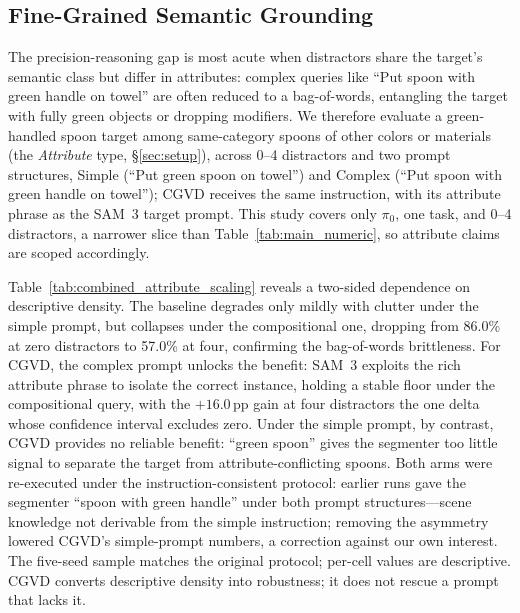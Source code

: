 \documentclass[letterpaper, 10 pt, conference]{ieeeconf}  %
\begin{document}
\subsection{Fine-Grained Semantic Grounding}
\label{sec:attribute}
The precision-reasoning gap is most acute when distractors share the target's semantic class but differ in attributes: complex queries like ``Put spoon with green handle on towel'' are often reduced to a bag-of-words, entangling the target with fully green objects or dropping modifiers. We therefore evaluate a green-handled spoon target among same-category spoons of other colors or materials (the \textit{Attribute} type, \S\ref{sec:setup}), across 0--4 distractors and two prompt structures, Simple (``Put green spoon on towel'') and Complex (``Put spoon with green handle on towel''); CGVD receives the same instruction, with its attribute phrase as the SAM~3 target prompt. This study covers only $\pi_0$, one task, and 0--4 distractors, a narrower slice than Table~\ref{tab:main_numeric}, so attribute claims are scoped accordingly.

Table~\ref{tab:combined_attribute_scaling} reveals a two-sided dependence on descriptive density. The baseline degrades only mildly with clutter under the simple prompt, but collapses under the compositional one, dropping from 86.0\% at zero distractors to 57.0\% at four, confirming the bag-of-words brittleness. For CGVD, the complex prompt unlocks the benefit: SAM~3 exploits the rich attribute phrase to isolate the correct instance, holding a stable floor under the compositional query, with the $+16.0$\,pp gain at four distractors the one delta whose confidence interval excludes zero. Under the simple prompt, by contrast, CGVD provides no reliable benefit: ``green spoon'' gives the segmenter too little signal to separate the target from attribute-conflicting spoons. Both arms were re-executed under the instruction-consistent protocol: earlier runs gave the segmenter ``spoon with green handle'' under both prompt structures---scene knowledge not derivable from the simple instruction; removing the asymmetry lowered CGVD's simple-prompt numbers, a correction against our own interest. The five-seed sample matches the original protocol; per-cell values are descriptive. CGVD converts descriptive density into robustness; it does not rescue a prompt that lacks it.
\end{document}
